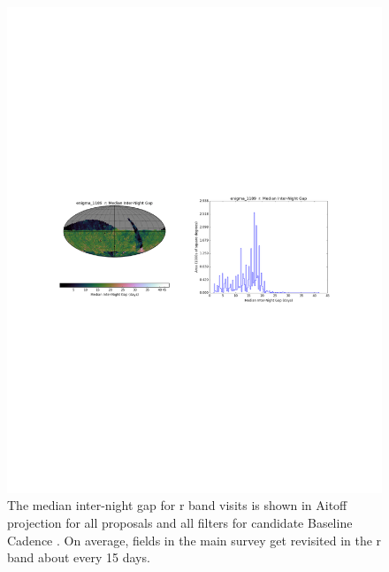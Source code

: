 \begin{figure}[h!]
\vskip -3.8in
\hskip -0.5in
\includegraphics[angle=0,width=1.19\hsize:,clip]{figs/enigma1189_interGap_r.pdf}
\vskip -4.0in
\caption{The median inter-night gap for r band visits is shown in Aitoff projection
for all proposals and all filters for candidate Baseline Cadence .
On average, fields in the main survey get revisited in the r band about every 15 days.}
\label{fig:enigmaGapr}
\end{figure}


